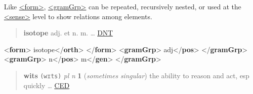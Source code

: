 Like \hyperref[TEI.form]{<form>}, \hyperref[TEI.gramGrp]{<gramGrp>} can be repeated, recursively nested, or used at the \hyperref[TEI.sense]{<sense>} level to show relations among elements.
\begin{quote}{\bfseries isotope} adj. et n. m. … \hyperref[DIC-DNT]{DNT}\end{quote}
 \par\bgroup{}\exampleFont \begin{shaded}\noindent\mbox{}{<\textbf{form}>}\mbox{}\newline 
{}isotope{</\textbf{orth}>}\mbox{}\newline 
{</\textbf{form}>}\mbox{}\newline 
{<\textbf{gramGrp}>}\mbox{}\newline 
{}adj{</\textbf{pos}>}\mbox{}\newline 
{</\textbf{gramGrp}>}\mbox{}\newline 
{<\textbf{gramGrp}>}\mbox{}\newline 
{}n{</\textbf{pos}>}\mbox{}\newline 
{}m{</\textbf{gen}>}\mbox{}\newline 
{</\textbf{gramGrp}>}\end{shaded}\egroup\par \noindent                                  
\begin{quote}{\bfseries wits} \texttt{(wɪts)} {\itshape pl n} {\bfseries 1} ({\itshape sometimes singular}) the ability to reason and act, esp quickly … \hyperref[DIC-CED]{CED}\end{quote}
